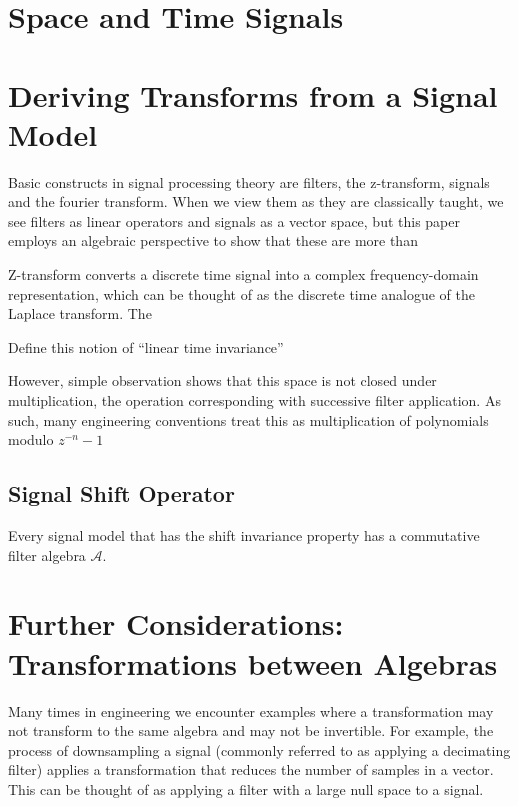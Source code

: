 \documentclass[12pt,technote]{IEEEtran}
\begin{document}
\section{Space and Time Signals}

\section{Deriving Transforms from a Signal Model}

\cite{AlgebraicSignalProcessing2006}
Basic constructs in signal processing theory are filters, the z-transform, signals and the fourier transform. When we view them as they are classically taught, we see filters as linear operators and signals as a vector space, but this paper employs an algebraic perspective to show that these are more than 

Z-transform converts a discrete time signal  into a complex frequency-domain representation, which can be thought of as the discrete time analogue of the Laplace transform. The 

Define this notion of ``linear time invariance''


However, simple observation shows that this space is not closed under multiplication, the operation corresponding with successive filter application. As such, many engineering conventions treat this as multiplication of polynomials modulo $z^{-n}-1$

\subsection{Signal Shift Operator}
Every signal model that has the shift invariance property has a commutative filter algebra $\mathcal{A}$.
\section{Further Considerations: Transformations between Algebras}
Many times in engineering we encounter examples where a transformation may not transform to the same algebra and may not be invertible. For example, the process of downsampling a signal (commonly referred to as applying a decimating filter) applies a transformation that reduces the number of samples in a vector. This can be thought of as applying a filter with a large null space to a signal.
\end{document}

